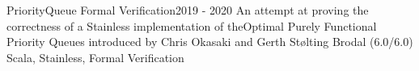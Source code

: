 \begin{projects}
\project
{PriorityQueue Formal Verification}{2019 - 2020}
{}
{An attempt at proving the correctness of a Stainless implementation of theOptimal Purely Functional Priority Queues introduced by Chris Okasaki and Gerth Stølting Brodal (6.0/6.0)}
{Scala, Stainless, Formal Verification}


\end{projects}